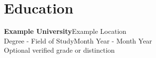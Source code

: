 \section{Education}
\textbf{Example University}\hfill\textcolor{muted}{Example Location}\\
Degree - Field of Study\hfill\textcolor{muted}{Month Year - Month Year}\\
Optional verified grade or distinction
